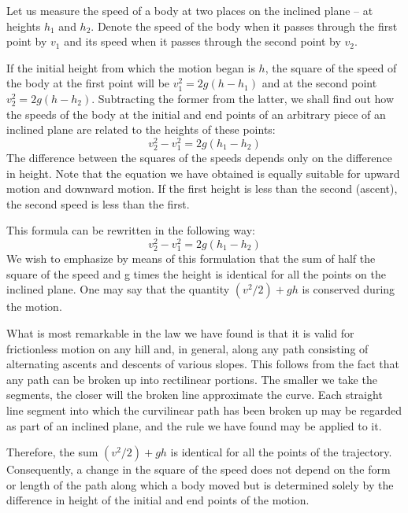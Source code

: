 Let us measure the speed of a body at two places on
the inclined plane -- at heights $h_{1}$ and $h_{2}$. Denote the
speed of the body when it passes through the first point
by $v_{1}$ and its speed when it passes through the second
point by $v_{2}$.

If the initial height from which the motion began is $h$,
the square of the speed of the body at the first point
will be $v_{1}^{2} = 2g (h - h_{1})$ and at the second point $v_{2}^{2}= 2g (h - h_{2})$. Subtracting the former from the latter,
we shall find out how the speeds of the body at the initial
and end points of an arbitrary piece of an inclined plane
are related to the heights of these points:
\begin{equation*}%
v_{2}^{2} - v_{1}^{2} = 2g (h_{1} - h_{2})
\end{equation*}
The difference between the squares of the speeds depends
only on the difference in height. Note that the equation
we have obtained is equally suitable for upward motion
and downward motion. If the first height is less than the
second (ascent), the second speed is less than the first.

This formula can be rewritten in the following way:
\begin{equation*}%
v_{2}^{2} - v_{1}^{2} = 2g (h_{1} - h_{2})
\end{equation*}
We wish to emphasize by means of this formulation
that the sum of half the square of the speed and g times
the height is identical for all the points on the inclined
plane. One may say that the quantity $(v^{2}/2) + gh$ is conserved during the motion.

What is most remarkable in the law we have found is
that it is valid for frictionless motion on any hill and,
in general, along any path consisting of alternating
ascents and descents of various slopes. This follows from
the fact that any path can be broken up into rectilinear
portions. The smaller we take the segments, the closer
will the broken line approximate the curve. Each straight
line segment into which the curvilinear path has been
broken up may be regarded as part of an inclined plane,
and the rule we have found may be applied to it.

Therefore, the sum $(v^{2}/2) + gh$ is identical for all the points of the trajectory. Consequently, a change in the square of the speed does not depend on the form or length of the path along which a body moved but is determined solely by the difference in height of the initial and end points of the motion.

